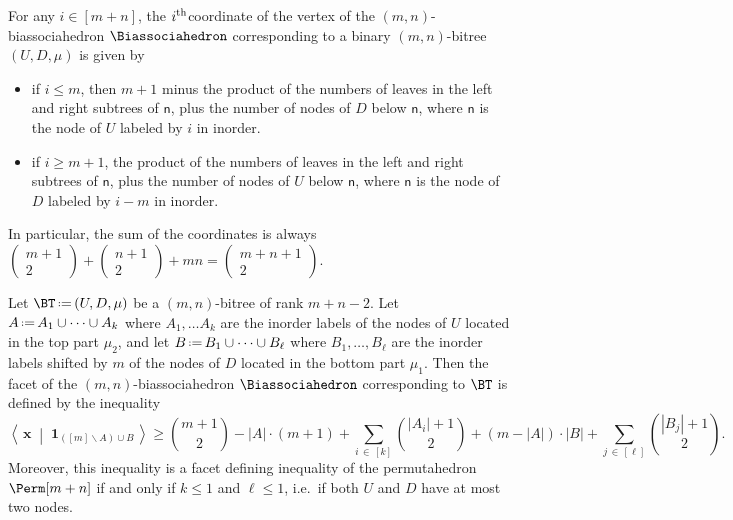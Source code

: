 \documentclass[AHL,Unicode,longabstracts,published]{cedram}
\renewcommand{\b}[1]{\boldsymbol{#1}}
\newcommand{\ssm}{\smallsetminus}
\newcommand{\dotprod}[2]{\left\langle \, #1 \; \middle| \; #2 \, \right\rangle}
\newcommand{\one}{\b{1}}
\newcommand{\eqdef}{\mbox{\,\raisebox{0.2ex}{\scriptsize\ensuremath{\mathrm:}}\ensuremath{=}\,}}
\newcommand{\ie}{i.e.~}
\newcommand{\node}[1]{\mathsf{#1}}
\begin{document}
\begin{prop}\label{prop:verticesBiassociahedron}
For any $i \in [m+n]$, the $i^{\rm th}$coordinate of the vertex of the $(m,n)$-biassociahedron $\Biassociahedron$ corresponding to a binary $(m,n)$-bitree $(U, D, \mu)$ is given by
\begin{itemize}
\item if $i \le m$, then $m+1$ minus the product of the numbers of leaves in the left and right subtrees of $\node{n}$, plus the number of nodes of $D$ below $\node{n}$, where $\node{n}$ is the node of $U$ labeled by $i$ in inorder.
\item if $i \ge m+1$, the product of the numbers of leaves in the left and right subtrees of $\node{n}$, plus the number of nodes of $U$ below $\node{n}$, where $\node{n}$ is the node of $D$ labeled by $i-m$ in inorder.
\end{itemize}
In particular, the sum of the coordinates is always $(\begin{smallmatrix} m+1\\2\end{smallmatrix}) + (\begin{smallmatrix} n+1\\2\end{smallmatrix}) + mn = (\begin{smallmatrix} m+n+1\\2\end{smallmatrix})$.
\end{prop}

\begin{prop}\label{prop:facetsBiassociahedron}
Let $\BT \eqdef (U, D, \mu)$ be a $(m,n)$-bitree of rank $m+n-2$. Let~${A \eqdef A_1 \cup \dots \cup A_k}$ where $A_1, \dots A_k$ are the inorder labels of the nodes of $U$ located in the top part $\mu_2$, and let ${B \eqdef B_1 \cup \dots \cup B_\ell}$ where $B_1, \dots, B_\ell$ are the inorder labels shifted by $m$ of the nodes of $D$ located in the bottom part $\mu_1$. Then the facet of the $(m,n)$-biassociahedron $\Biassociahedron$ corresponding to $\BT$ is defined by the inequality
\[
\dotprod{\b{x}}{\one_{([m] \ssm A) \cup B}} \ge \textstyle{\binom{m+1}{2}} - |A| \cdot (m+1) + \sum\limits_{i \,\in\,[k]} \textstyle{\binom{|A_i|+1}{2}} + (m-|A|) \cdot |B| + \sum\limits_{j\,\in\,[\ell]} \textstyle{\binom{|B_j|+1}{2}}.
\]
Moreover, this inequality is a facet defining inequality of the permutahedron \linebreak $\Perm[m+n]$ if and only if $k \le 1$ and $\ell \le 1$, \ie if both $U$ and $D$ have at most two nodes.
\end{prop}
\end{document}
